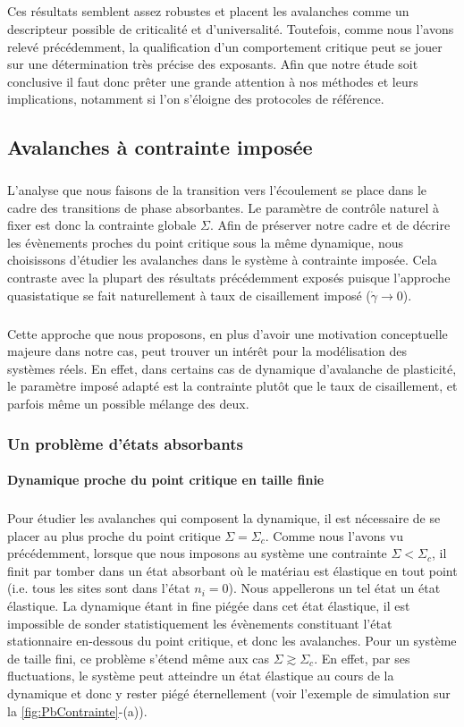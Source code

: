 \subparagraph{}Ces résultats semblent assez robustes et placent les avalanches comme un descripteur possible de criticalité et d'universalité. Toutefois, comme nous l'avons relevé précédemment, la qualification d'un comportement critique peut se jouer sur une détermination très précise des exposants. Afin que notre étude soit conclusive il faut donc prêter une grande attention à nos méthodes et leurs implications, notamment si l'on s'éloigne des protocoles de référence.

\subsection{Avalanches à contrainte imposée}

\subparagraph{}L'analyse que nous faisons de la transition vers l'écoulement se place dans le cadre des transitions de phase absorbantes. Le paramètre de contrôle naturel à fixer est donc la contrainte globale $\Sigma$. Afin de préserver notre cadre et de décrire les évènements proches du point critique sous la même dynamique, nous choisissons d'étudier les avalanches dans le système à contrainte imposée. Cela contraste avec la plupart des résultats précédemment exposés puisque l'approche quasistatique se fait naturellement à taux de cisaillement imposé ($\dot{\gamma}\rightarrow 0$).

\subparagraph{}Cette approche que nous proposons, en plus d'avoir une motivation conceptuelle majeure dans notre cas, peut trouver un intérêt pour la modélisation des systèmes réels. En effet, dans certains cas de dynamique d'avalanche de plasticité, le paramètre imposé adapté est la contrainte plutôt que le taux de cisaillement, et parfois même un possible mélange des deux.

\subsubsection{Un problème d'états absorbants}

\paragraph{Dynamique proche du point critique en taille finie}

\subparagraph{}Pour étudier les avalanches qui composent la dynamique, il est nécessaire de se placer au plus proche du point critique $\Sigma = \Sigma_c$. Comme nous l'avons vu précédemment, lorsque que nous imposons au système une contrainte $\Sigma < \Sigma_c$, il finit par tomber dans un état absorbant où le matériau est élastique en tout point (i.e. tous les sites sont dans l'état $n_i = 0$). Nous appellerons un tel état un état élastique. La dynamique étant in fine piégée dans cet état élastique, il est impossible de sonder statistiquement les évènements constituant l'état stationnaire en-dessous du point critique, et donc les avalanches. Pour un système de taille fini, ce problème s'étend même aux cas $\Sigma \gtrsim \Sigma_c$. En effet, par ses fluctuations, le système peut atteindre un état élastique au cours de la dynamique et donc y rester piégé éternellement (voir l'exemple de simulation sur la \autoref{fig:PbContrainte}-(a)).

